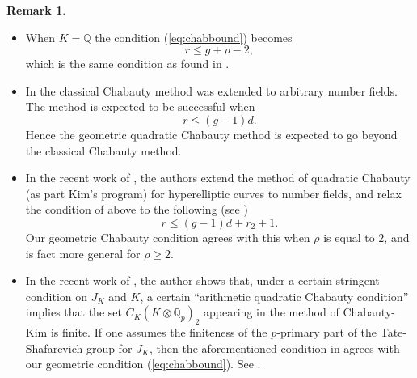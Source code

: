 \documentclass[11pt,oneside]{amsart}
\theoremstyle{plain}
\theoremstyle{definition}
\newtheorem{remark}[theorem]{Remark}
\DeclareMathOperator{\Hom}{Hom}
\def\Q{\mathbb{Q}}
\begin{document}
\begin{remark}
    \begin{itemize}
        \item When $K=\Q$ the condition (\ref{eq:chabbound}) becomes $$r\leq g+\rho-2,$$ which is the same condition as found in \cite{EL19}.
        \item In \cite{siksek} the classical Chabauty method was extended to arbitrary number fields. The method is expected to be successful when $$r\leq (g-1)d.$$ Hence the geometric quadratic Chabauty method is expected to go beyond the classical Chabauty method.
        \item In the recent work  of \cite{BBBM19}, the authors extend the method of quadratic Chabauty (as part Kim's program) for hyperelliptic curves to number fields, and relax the condition of \cite{siksek} above to the following (see \cite[(1.4)]{BBBM19})
        $$ r \le (g-1) d + r_2 + 1. $$
        Our geometric Chabauty condition agrees with this when $\rho$ is equal to $2$, and is fact more general for $\rho \ge 2$. 
        \item In the recent work of \cite{Dogra19}, the author shows that, under a certain stringent condition on $J_K$ and $K$, a certain ``arithmetic quadratic Chabauty condition'' implies that the set $C_K(K\otimes \Q_p)_2$ appearing in the method of Chabauty-Kim is finite. 
 If one assumes the finiteness of the $p$-primary part of the Tate-Shafarevich group for $J_K$, then the aforementioned condition in \cite{Dogra19} agrees with our geometric condition (\ref{eq:chabbound}). See \cite[Proposition 1.1 \& Remark 1.3]{Dogra19}. 
    \end{itemize}

\end{remark}
\end{document}

